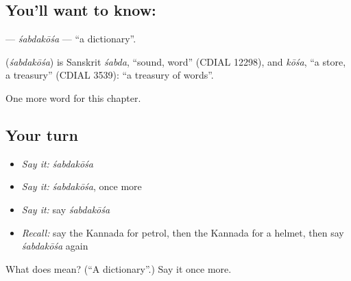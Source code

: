 \subsection*{You'll want to know: }
\textbf{} — \emph{śabdakōśa} — \textquotedblleft{}a dictionary\textquotedblright{}.

\begin{cousinweb}
\textbf{} (\emph{śabdakōśa}) is Sanskrit \emph{śabda}, \textquotedblleft{}sound, word\textquotedblright{} (CDIAL 12298), and \emph{kōśa}, \textquotedblleft{}a store, a treasury\textquotedblright{} (CDIAL 3539): \textquotedblleft{}a treasury of words\textquotedblright{}.
\end{cousinweb}

\begin{grammarlens}[title={What you've built}]
One more word for this chapter.
\end{grammarlens}

\subsection*{Your turn}
\begin{itemize}
\raggedright
  \item \emph{Say it:} \emph{śabdakōśa}
  \item \emph{Say it:} \emph{śabdakōśa}, once more
  \item \emph{Say it:} say \emph{śabdakōśa}
  \item \emph{Recall:} say the Kannada for petrol, then the Kannada for a helmet, then say \emph{śabdakōśa} again
\end{itemize}

\begin{tcolorbox}[breakable,colback=teal!4,colframe=teal!35!black,title={Before you move on}]
What does  mean? (\textquotedblleft{}A dictionary\textquotedblright{}.) Say it once more.
\end{tcolorbox}
